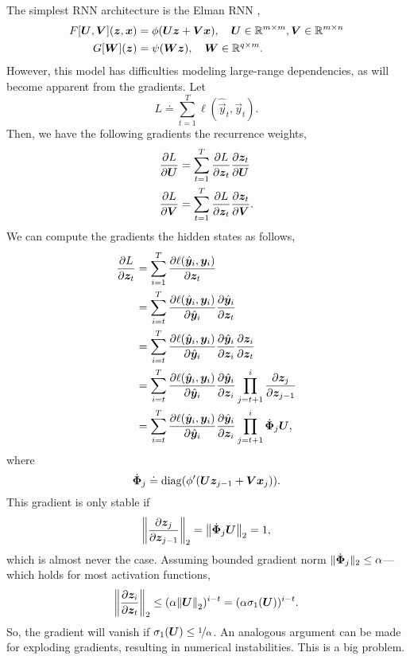 The simplest RNN architecture is the Elman RNN \citep{elman1990finding},
\begin{align*}
    F[\bm{U}, \bm{V}](\bm{z}, \bm{x}) & = \phi(\bm{U} \bm{z} + \bm{V} \bm{x}), \quad \bm{U} \in \mathbb{R}^{m \times m}, \bm{V} \in \mathbb{R}^{m \times n} \\
    G[\bm{W}](\bm{z})                   & = \psi(\bm{W} \bm{z}), \quad \bm{W} \in \mathbb{R}^{q \times m}.
\end{align*}
However, this model has difficulties modeling large-range dependencies, as will become apparent
from the gradients. Let \[
    L \doteq \sum_{t=1}^{T} \ell(\hat{\vec{y}}_t, \vec{y}_t).
\]
Then, we have the following gradients \wrt the recurrence weights,
\begin{align*}
    \pdv{L}{\bm{U}} & = \sum_{t=1}^{T} \pdv{L}{\bm{z}_t} \pdv{\bm{z}_t}{\bm{U}}  \\
    \pdv{L}{\bm{V}} & = \sum_{t=1}^{T} \pdv{L}{\bm{z}_t} \pdv{\bm{z}_t}{\bm{V}}. \\
\end{align*}
We can compute the gradients \wrt the hidden states as follows,
\begin{align*}
    \pdv{L}{\bm{z}_t} & = \sum_{i=1}^{T} \pdv{\ell(\hat{\bm{y}}_i, \bm{y}_i)}{\bm{z}_t}                                                                                       \\
                       & = \sum_{i=t}^{T} \pdv{\ell(\hat{\bm{y}}_i, \bm{y}_i)}{\hat{\bm{y}}_i} \pdv{\hat{\bm{y}}_i}{\bm{z}_t}                                                \\
                       & = \sum_{i=t}^{T} \pdv{\ell(\hat{\bm{y}}_i, \bm{y}_i)}{\hat{\bm{y}}_i} \pdv{\hat{\bm{y}}_i}{\bm{z}_i} \pdv{\bm{z}_i}{\bm{z}_t}                     \\
                       & = \sum_{i=t}^{T} \pdv{\ell(\hat{\bm{y}}_i, \bm{y}_i)}{\hat{\bm{y}}_i} \pdv{\hat{\bm{y}}_i}{\bm{z}_i} \prod_{j=t+1}^i \pdv{\bm{z}_j}{\bm{z}_{j-1}} \\
                       & = \sum_{i=t}^{T} \pdv{\ell(\hat{\bm{y}}_i, \bm{y}_i)}{\hat{\bm{y}}_i} \pdv{\hat{\bm{y}}_i}{\bm{z}_i} \prod_{j=t+1}^i \dot{\bm{\Phi}}_j \bm{U},
\end{align*}
where \[
    \dot{\mat{\Phi}}_j \doteq \mathrm{diag} \lft( \phi'(\mat{U} \vec{z}_{j-1} + \mat{V}\vec{x}_j) \rgt).
\]
This gradient is only stable if \[
    \lft\| \pdv{\vec{z}_j}{\vec{z}_{j-1}} \rgt\|_2 = \lft\| \dot{\mat{\Phi}}_j \mat{U} \rgt\|_2 = 1,
\]
which is almost never the case. Assuming bounded gradient norm $\| \dot{\bm{\Phi}}_j \|_2 \leq
    \alpha$---which holds for most activation functions, \[
    \lft\| \pdv{\vec{z}_i}{\vec{z}_t} \rgt\|_2 \leq (\alpha \lft\| \mat{U} \rgt\|_2)^{i-t} = (\alpha \sigma_1(\mat{U}))^{i-t}.
\]
So, the gradient will vanish if $\sigma_1(\bm{U}) \leq \nicefrac{1}{\alpha}$. An analogous
argument can be made for exploding gradients, resulting in numerical instabilities. This is a big
problem.

